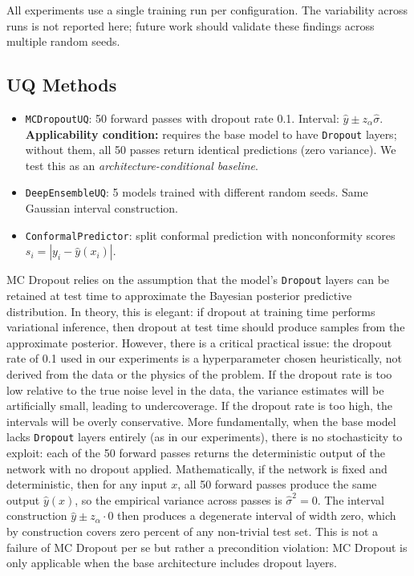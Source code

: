 \documentclass[12pt,a4paper]{article}
\theoremstyle{plain}
\begin{document}
All experiments use a single training run per configuration.
The variability across runs is not reported here; future work should
validate these findings across multiple random seeds.

\subsection{UQ Methods}

\begin{itemize}
    \item \texttt{MCDropoutUQ}: 50 forward passes with dropout rate 0.1.
        Interval: $\hat{y} \pm z_\alpha \hat{\sigma}$.
        \textbf{Applicability condition:} requires the base model to have
        \texttt{Dropout} layers; without them, all 50 passes return
        identical predictions (zero variance).  We test this as an
        \emph{architecture-conditional baseline}.
    \item \texttt{DeepEnsembleUQ}: 5 models trained with different random seeds.
        Same Gaussian interval construction.
    \item \texttt{ConformalPredictor}: split conformal prediction with
        nonconformity scores $s_i = |y_i - \hat{y}(x_i)|$.
\end{itemize}

MC Dropout relies on the assumption that the model's \texttt{Dropout} layers
can be retained at test time to approximate the Bayesian posterior predictive
distribution. In theory, this is elegant: if dropout at training time performs
variational inference, then dropout at test time should produce samples from
the approximate posterior. However, there is a critical practical issue: the
dropout rate of 0.1 used in our experiments is a hyperparameter chosen
heuristically, not derived from the data or the physics of the problem.
If the dropout rate is too low relative to the true noise level in the data,
the variance estimates will be artificially small, leading to undercoverage.
If the dropout rate is too high, the intervals will be overly conservative.
More fundamentally, when the base model lacks \texttt{Dropout} layers
entirely (as in our experiments), there is no stochasticity to exploit:
each of the 50 forward passes returns the deterministic output of the
network with no dropout applied. Mathematically, if the network is fixed
and deterministic, then for any input $x$, all 50 forward passes produce
the same output $\hat{y}(x)$, so the empirical variance across passes is
$\hat{\sigma}^2 = 0$. The interval construction $\hat{y} \pm z_\alpha \cdot 0$
then produces a degenerate interval of width zero, which by construction
covers zero percent of any non-trivial test set. This is not a failure of
MC Dropout per se but rather a precondition violation: MC Dropout is only
applicable when the base architecture includes dropout layers.
\end{document}
